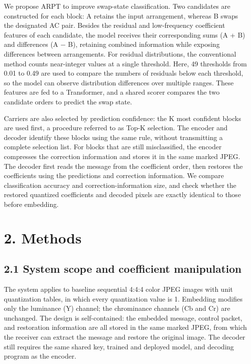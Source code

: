 \documentclass[
  11pt,
  a4paper,
]{article}
\begin{document}
We propose ARPT to improve swap-state classification. Two candidates are
constructed for each block: A retains the input arrangement, whereas B
swaps the designated AC pair. Besides the residual and low-frequency
coefficient features of each candidate, the model receives their
corresponding sums (A + B) and differences (A − B), retaining combined
information while exposing differences between arrangements. For
residual distributions, the conventional method counts near-integer
values at a single threshold. Here, 49 thresholds from 0.01 to 0.49 are
used to compare the numbers of residuals below each threshold, so the
model can observe distribution differences over multiple ranges. These
features are fed to a Transformer, and a shared scorer compares the two
candidate orders to predict the swap state.

Carriers are also selected by prediction confidence: the K most
confident blocks are used first, a procedure referred to as Top-K
selection. The encoder and decoder identify these blocks using the same
rule, without transmitting a complete selection list. For blocks that
are still misclassified, the encoder compresses the correction
information and stores it in the same marked JPEG. The decoder first
reads the message from the coefficient order, then restores the
coefficients using the predictions and correction information. We
compare classification accuracy and correction-information size, and
check whether the restored quantized coefficients and decoded pixels are
exactly identical to those before embedding.

\section*{2. Methods}\label{methods}

\subsection*{2.1 System scope and coefficient
manipulation}\label{system-scope-and-coefficient-manipulation}

The system applies to baseline sequential 4:4:4 color JPEG images with
unit quantization tables, in which every quantization value is 1.
Embedding modifies only the luminance (Y) channel; the chrominance
channels (Cb and Cr) are unchanged. The design is self-contained: the
embedded message, control packet, and restoration information are all
stored in the same marked JPEG, from which the receiver can extract the
message and restore the original image. The decoder still requires the
same shared key, trained and deployed model, and decoding program as the
encoder.
\end{document}
